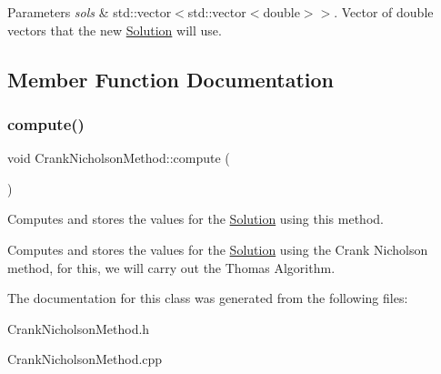 \begin{DoxyParams}{Parameters}
{\em sols} & std\+::vector$<$std\+::vector$<$double$>$$>$. Vector of double vectors that the new \hyperlink{class_solution}{Solution} will use. \\
\hline
\end{DoxyParams}


\subsection{Member Function Documentation}
\mbox{\label{class_crank_nicholson_method_a10558e5238673e11a76b4e10e8c588b4}} 
\subsubsection{\texorpdfstring{compute()}{compute()}}
{\footnotesize\ttfamily void Crank\+Nicholson\+Method\+::compute (\begin{DoxyParamCaption}{ }\end{DoxyParamCaption})}

Computes and stores the values for the \hyperlink{class_solution}{Solution} using this method.

Computes and stores the values for the \hyperlink{class_solution}{Solution} using the Crank Nicholson method, for this, we will carry out the Thomas Algorithm. 

The documentation for this class was generated from the following files\+:\begin{DoxyCompactItemize}
\item 
Crank\+Nicholson\+Method.\+h\item 
Crank\+Nicholson\+Method.\+cpp\end{DoxyCompactItemize}
